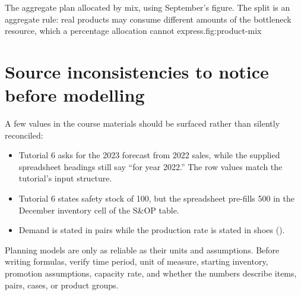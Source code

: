 \begin{utpfig}{The aggregate plan allocated by
mix, using September's figure. The split is an aggregate rule: real products may
consume different amounts of the bottleneck resource, which a percentage
allocation cannot express.}{fig:product-mix}
\end{utpfig}

\section{Source inconsistencies to notice before modelling}

A few values in the course materials should be surfaced rather than silently
reconciled:

\begin{itemize}
  \item Tutorial 6 asks for the 2023 forecast from 2022 sales, while the supplied spreadsheet headings still say ``for year 2022.'' The row values match the tutorial's input structure.
  \item Tutorial 6 states safety stock of 100, but the spreadsheet pre-fills 500 in the December inventory cell of the S\&OP table.
  \item Demand is stated in pairs while the production rate is stated in shoes ().
\end{itemize}

\begin{keyidea}
Planning models are only as reliable as their units and assumptions. Before
writing formulas, verify time period, unit of measure, starting inventory,
promotion assumptions, capacity rate, and whether the numbers describe items,
pairs, cases, or product groups.
\end{keyidea}

